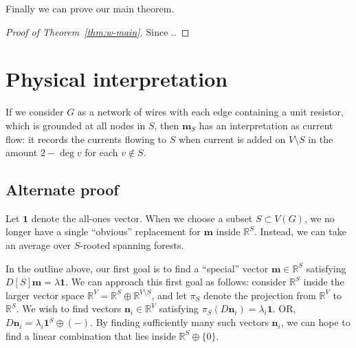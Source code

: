 \documentclass{amsart}
\theoremstyle{definition}
\newcommand{\RR}{\mathbb{R}}
\newcommand{\boldm}{\mathbf{m}}
\begin{document}
Finally we can prove our main theorem.

\begin{proof}[Proof of Theorem~\ref{thm:w-main}]
Since ..
\end{proof}

\section{Physical interpretation}

If we consider $G$ as a network of wires with each edge containing a unit resistor,
which is grounded at all nodes in $S$,
then $\boldm_S$ has an interpretation as current flow: 
it records the currents flowing to $S$
when current is added on $V\setminus S$ in the amount $2 - \deg v$
for each $v\not\in S$.

\subsection{Alternate proof}

Let $\mathbf{1}$ denote the all-ones vector.
When we choose a subset $S \subset V(G)$, we no longer have a single ``obvious'' replacement for $\boldm$ inside $\RR^S$.
Instead, we can take an average over $S$-rooted spanning forests.

In the outline above, our first goal is to find a ``special'' vector $ \boldm\in \RR^S$ satisfying $D[S] \boldm = \lambda \mathbf{1}$.
We can approach this first goal as follows: 
consider $\RR^S$ inside the larger vector space $\RR^V = \RR^S \oplus \RR^{V\setminus S}$,
and let $\pi_S$ denote the projection from $\RR^V$ to $\RR^S$.
We wish to find vectors $\mathbf{n}_i \in \RR^{V}$ satisfying
$\pi_S( D \mathbf{n}_i) = \lambda_i \mathbf{1}$.
OR, $D \mathbf{n}_i = \lambda_i \mathbf{1}^S \oplus (-)$.
By finding sufficiently many such vectors $\mathbf{n}_i$,
we can hope to find a linear combination that lies inside $\RR^S \oplus \{0\}$.
\end{document}
